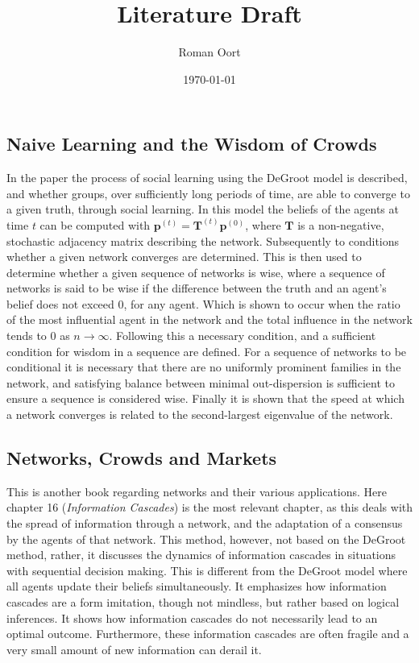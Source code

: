 \documentclass{article}
\title{Literature Draft}
\author{Roman Oort}
\date{\today}
\begin{document}
\maketitle
\subsection*{Naive Learning and the Wisdom of Crowds \cite{golub2010naive}}
In the paper the process of social learning using the DeGroot model is described, and whether groups, over sufficiently long periods of time, are able to converge to a given truth, through social learning. \newline
In this model the beliefs of the agents at time $t$ can be computed with \newline
$\textbf{p}^{(t)} = \textbf{T}^{(t)}\textbf{p}^{(0)}$, where $\textbf{T}$ is a non-negative, stochastic adjacency matrix describing the network. \newline
Subsequently to conditions whether a given network converges are determined. This is then used to determine whether a given sequence of networks is wise, where a sequence of networks is said to be wise if the difference between the truth and an agent's belief does not exceed 0, for any agent. Which is shown to occur when the ratio of the most influential agent in the network and the total influence in the network tends to 0 as $n \to \infty$. \newline
Following this a necessary condition, and a sufficient condition for wisdom in a sequence are defined.
For a sequence of networks to be conditional it is necessary that there are no uniformly prominent families in the network, and satisfying balance between minimal out-dispersion is sufficient to ensure a sequence is considered wise.\newline
Finally it is shown that the speed at which a network converges is related to the second-largest eigenvalue of the network.

\subsection*{Networks, Crowds and Markets \cite{easley2010networks}}
This is another book regarding networks and their various applications. Here chapter 16 (\textit{Information Cascades}) is the most relevant chapter, as this deals with the spread of information through a network, and the adaptation of a consensus by the agents of that network. This method, however, not based on the DeGroot method, rather, it discusses the dynamics of information cascades in situations with sequential decision making. This is different from the DeGroot model where all agents update their beliefs simultaneously. It emphasizes how information cascades are a form imitation, though not mindless, but rather based on logical inferences. It shows how information cascades do not necessarily lead to an optimal outcome. Furthermore, these information cascades are often fragile and a very small amount of new information can derail it.
\newpage
\end{document}
